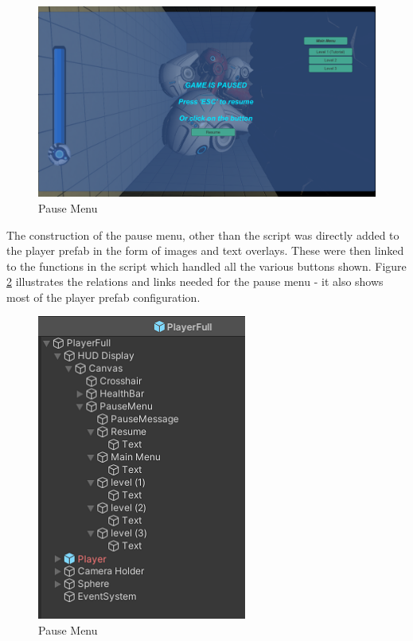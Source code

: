 \begin{figure}[H]
\centering
\includegraphics[scale=0.45]{Figures/pause.png}
\caption{Pause Menu}
\label{pause}
\end{figure}

\noindent The construction of the pause menu, other than the script was directly added to the player prefab in the form of images and text overlays. These were then linked to the functions in the script which handled all the various buttons shown. Figure \ref{pause2} illustrates the relations and links needed for the pause menu - it also shows most of the player prefab configuration.

\begin{figure}[H]
\centering
\includegraphics[scale=1]{Figures/pause2.png}
\caption{Pause Menu}
\label{pause2}
\end{figure}

